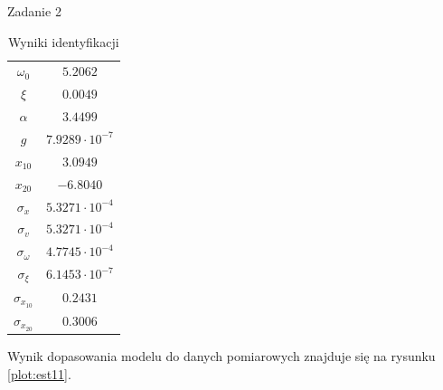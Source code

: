 \documentclass[12pt]{article}
\begin{document}
\begin{section}{Zadanie 2}
    \begin{table}[!htb]
      \begin{center}
        \begin{tabular}{|c|c|}
          \hline
          $\omega_0$        & $ 5.2062 $ \\
          $\xi$             & $ 0.0049 $ \\
          $\alpha$          & $ 3.4499 $ \\
          $g$               & $ 7.9289\cdot 10^{-7} $ \\
          $x_{10}$          & $  3.0949 $ \\
          $x_{20}$          & $ -6.8040 $ \\
          $\sigma_{x}$      & $ 5.3271\cdot 10^{-4} $ \\
          $\sigma_{v}$      & $ 5.3271\cdot 10^{-4} $ \\
          \hline
          $\sigma_{\omega}$ & $ 4.7745\cdot 10^{-4} $ \\ 
          $\sigma_{\xi}$    & $ 6.1453\cdot 10^{-7} $ \\
          $\sigma_{x_{10}}$ & $ 0.2431 $ \\
          $\sigma_{x_{20}}$ & $ 0.3006 $ \\
          \hline
        \end{tabular}
      \end{center}
      \label{tab:wyn12}
      \caption{Wyniki identyfikacji}
    \end{table}
    
    \newpage
    
    Wynik dopasowania modelu do danych pomiarowych znajduje się na rysunku
    \ref{plot:est11}.


\end{section}
\end{document}
